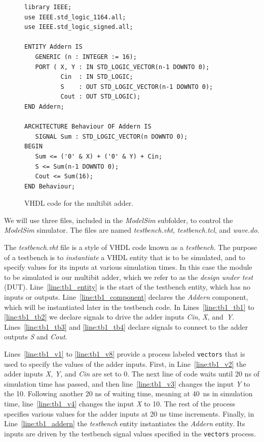\documentclass[11pt, twoside, pdftex]{article}
\begin{document}
\lstset{language=VHDL,numbers=none,escapechar=|}
\begin{figure}[h]
\begin{center}
\begin{minipage}[t]{12.5 cm}
\begin{lstlisting}[name=addern]
library IEEE;
use IEEE.std_logic_1164.all;
use IEEE.std_logic_signed.all;

ENTITY Addern IS 
   GENERIC (n : INTEGER := 16);
   PORT ( X, Y : IN STD_LOGIC_VECTOR(n-1 DOWNTO 0);
          Cin  : IN STD_LOGIC;
          S    : OUT STD_LOGIC_VECTOR(n-1 DOWNTO 0);
          Cout : OUT STD_LOGIC);
END Addern;

ARCHITECTURE Behaviour OF Addern IS 
   SIGNAL Sum : STD_LOGIC_VECTOR(n DOWNTO 0);
BEGIN 
   Sum <= ('0' & X) + ('0' & Y) + Cin;
   S <= Sum(n-1 DOWNTO 0);
   Cout <= Sum(16);
END Behaviour;
\end{lstlisting}
\end{minipage}
\caption{VHDL code for the multibit adder.}
\label{fig:addern}
\end{center}
\end{figure}

\noindent
We will use three files, included in the {\it ModelSim} subfolder, to control the 
{\it ModelSim} simulator. The files are named {\it testbench.vht}, {\it testbench.tcl}, and 
{\it wave.do}.

\noindent
The {\it testbench.vht} file is a style of VHDL code known as a {\it testbench}. 
The purpose of a testbench is to {\it instantiate} a VHDL entity that is to be simulated,
and to specify values for its inputs at various simulation times. In this case the module
to be simulated is our multibit adder, which we refer to as the {\it design under test} (DUT).
Line~\ref{line:tb1_entity} is the start of the testbench entity, which has no inputs or
outputs. Line~\ref{line:tb1_component} declares the {\it Addern} component, which will be 
instantiated later in the testbench code. In Lines~\ref{line:tb1_tb1} to \ref{line:tb1_tb2} we 
declare signals to drive the adder inputs {\it Cin}, {\it X}, and~{\it Y}.
Lines~\ref{line:tb1_tb3} and \ref{line:tb1_tb4} declare signals to connect to the 
adder outputs {\it S} and {\it Cout}.

\noindent
Lines~\ref{line:tb1_v1} to \ref{line:tb1_v8} provide a process labeled \texttt{vectors} that is used
to specify the values of the adder inputs. First, in Line~\ref{line:tb1_v2} the adder inputs 
{\it X}, {\it Y}, and {\it Cin} are set to 0. The next line of code waits until 20 ns of 
simulation time has passed, and then line~\ref{line:tb1_v3} changes the input {\it Y} to the 
10.  Following another 20 ns of waiting time, meaning at 40~ns in simulation time, 
line~\ref{line:tb1_v4} changes the input {\it X} to 10. The rest of the
process specifies various values for the adder inputs at 20 ns time increments.
Finally, in Line~\ref{line:tb1_addern} the {\it testbench} entity instantiates the {\it Addern} entity. Its inputs are driven by the testbench signal values specified in the \texttt{vectors} process. 
\end{document}
